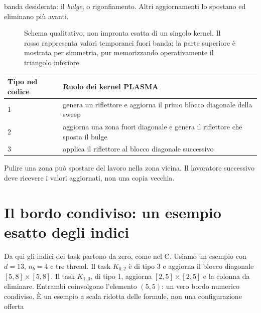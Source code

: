 \documentclass[11pt,a4paper]{article}
\newcommand{\semplice}[1]{\begin{idea}[title=In parole semplici]#1\end{idea}}
\newcommand{\page}[1]{\clearpage\section{#1}}
\begin{document}
banda desiderata: il \emph{bulge}, o rigonfiamento. Altri aggiornamenti lo
spostano ed eliminano più avanti.
\begin{figure}[H]\centering
{}
\caption{Schema qualitativo, non impronta esatta di un singolo kernel. Il rosso rappresenta valori temporanei fuori banda; la parte superiore è mostrata per simmetria, pur memorizzando operativamente il triangolo inferiore.}
\end{figure}
\begin{center}\small\begin{tabularx}{\linewidth}{lX}\toprule
Tipo nel codice&Ruolo dei kernel PLASMA\\\midrule
1&genera un riflettore e aggiorna il primo blocco diagonale della sweep\\
2&aggiorna una zona fuori diagonale e genera il riflettore che sposta il bulge\\
3&applica il riflettore al blocco diagonale successivo\\\bottomrule
\end{tabularx}\end{center}
\semplice{Pulire una zona può spostare del lavoro nella zona vicina. Il
lavoratore successivo deve ricevere i valori aggiornati, non una copia vecchia.}
\page{Il bordo condiviso: un esempio esatto degli indici}
Da qui gli indici dei task partono da zero, come nel C. Usiamo un esempio
con $d=13$, $n_b=4$ e tre thread. Il task $K_{0,2}$ è di tipo 3 e aggiorna
il blocco diagonale $[5,8]\times[5,8]$. Il task $K_{1,0}$, di tipo 1,
aggiorna $[2,5]\times[2,5]$ e la colonna da eliminare. Entrambi coinvolgono
l'elemento $(5,5)$: un vero bordo numerico condiviso.
È un esempio a scala ridotta delle formule, non una configurazione offerta
\end{document}
